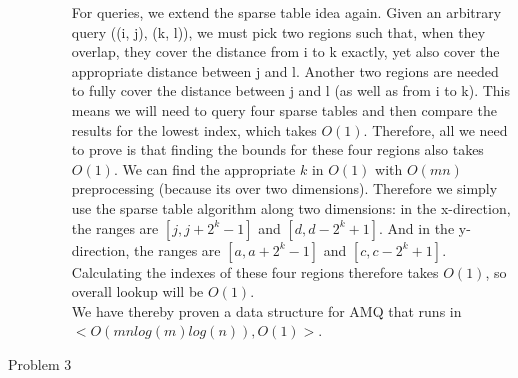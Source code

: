 \documentclass[11pt,oneside,a4paper]{article}
\begin{document}
\begin{description}
\begin{enumerate}[label=\roman*]
For queries, we extend the sparse table idea again. Given an arbitrary query ((i, j), (k, l)), we must pick two regions such that, when they overlap, they cover the distance from i to k exactly, yet also cover the appropriate distance between j and l. Another two regions are needed to fully cover the distance between j and l (as well as from i to k). This means we will need to query four sparse tables and then compare the results for the lowest index, which takes $O(1)$. Therefore, all we need to prove is that finding the bounds for these four regions also takes $O(1)$. We can find the appropriate $k$ in $O(1)$ with $O(mn)$ preprocessing (because its over two dimensions). Therefore we simply use the sparse table algorithm along two dimensions: in the x-direction, the ranges are $[j, j + 2^k - 1]$ and $[d, d - 2^k + 1]$. And in the y-direction, the ranges are $[a, a + 2^k - 1]$ and $[c, c - 2^k + 1]$. Calculating the indexes of these four regions therefore takes $O(1)$, so overall lookup will be $O(1)$.\\

We have thereby proven a data structure for AMQ that runs in $<O(mn log(m)log(n)), O(1)>$.

\end{enumerate}

\newpage

\item[Problem 3]\noindent 


\end{description}
\end{document}
